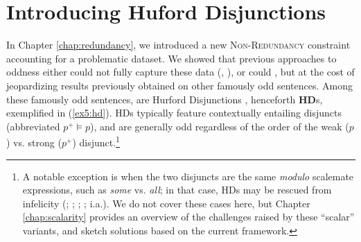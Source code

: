 \section{Introducing Huford Disjunctions}
In Chapter \ref{chap:redundancy}, we introduced a new \textsc{Non-Redundancy} constraint accounting for a problematic dataset. We showed that previous approaches to oddness either could not fully capture these data (, ), or could \parencite{Mayr2016}, but at the cost of jeopardizing results previously obtained on other famously odd sentences. Among these famously odd sentences, are Hurford Disjunctions \parencite{Hurford1974}, henceforth \textbf{HD}s, exemplified in (\ref{ex5:hd}). HDs typically feature contextually entailing disjuncts (abbreviated $p^+ \vDash p$), and are generally odd regardless of the order of the weak ($p$) vs. strong ($p^+$) disjunct.\footnote{A notable exception is when the two disjuncts are the same \textit{modulo} scalemate expressions, such as \textit{some} vs. \textit{all}; in that case, HDs may be rescued from infelicity (; ; ; ;  i.a.). We do not cover these cases here, but Chapter \ref{chap:scalarity} provides an overview of the challenges raised by these ``scalar'' variants, and sketch solutions based on the current framework.}

\begin{exe}
	\ex \label{ex5:hd}
	\begin{xlist}
		\label{ex5:hd-sw}
		\label{ex5:hd-ws}
	\end{xlist}
\end{exe}

